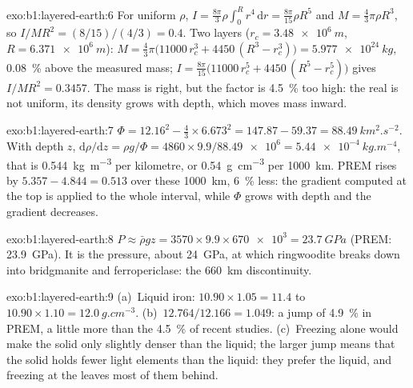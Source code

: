\begin{solution}{exo:b1:layered-earth:6}
For uniform $\rho$, $I = \tfrac{8\pi}{3}\rho\int_0^R r^4\,\mathrm dr =
\tfrac{8\pi}{15}\rho R^5$ and $M = \tfrac43\pi\rho R^3$, so
$I/MR^2 = (8/15)/(4/3) = 0.4$. Two layers ($r_c = \qty{3.48e6}{m}$,
$R = \qty{6.371e6}{m}$): $M = \tfrac43\pi\bigl(11000\,r_c^3 + 4450\,(R^3 -
r_c^3)\bigr) = \qty{5.977e24}{kg}$, \qty{0.08}{\percent} above the measured
mass; $I = \tfrac{8\pi}{15}\bigl(11000\,r_c^5 + 4450\,(R^5 - r_c^5)\bigr)$ gives
$I/MR^2 = 0.3457$. The mass is right, but the factor is \qty{4.5}{\percent}
too high: the real  is not uniform, its density grows with depth, which
moves mass inward.
\end{solution}

\begin{solution}{exo:b1:layered-earth:7}
$\Phi = 12.16^2 - \tfrac43\times6.673^2 = 147.87 - 59.37 =
\qty{88.49}{km^2.s^{-2}}$. With depth $z$,
$\mathrm d\rho/\mathrm dz = \rho g/\Phi = 4860\times9.9/\num{88.49e6} =
\qty{5.44e-4}{kg.m^{-4}}$, that is \qty{0.544}{kg.m^{-3}} per kilometre, or
\qty{0.54}{g.cm^{-3}} per \qty{1000}{km}. PREM rises by $5.357 - 4.844 =
0.513$ over these \qty{1000}{km}, \qty{6}{\percent} less: the gradient
computed at the top is applied to the whole interval, while $\Phi$ grows with
depth and the gradient decreases.
\end{solution}

\begin{solution}{exo:b1:layered-earth:8}
$P \approx \bar\rho g z = 3570\times9.9\times\num{670e3} = \qty{23.7}{GPa}$
(PREM: \qty{23.9}{GPa}). It is the pressure, about \qty{24}{GPa}, at which
ringwoodite breaks down into bridgmanite and ferropericlase: the
\qty{660}{km} discontinuity.
\end{solution}

\begin{solution}{exo:b1:layered-earth:9}
(a)~Liquid iron: $10.90\times1.05 = 11.4$ to $10.90\times1.10 =
\qty{12.0}{g.cm^{-3}}$. (b)~$12.764/12.166 = 1.049$: a jump of
\qty{4.9}{\percent} in PREM, a little more than the \qty{4.5}{\percent} of
recent studies. (c)~Freezing alone would make the solid only slightly denser
than the liquid; the larger jump means that the solid holds fewer light
elements than the liquid: they prefer the liquid, and freezing at the
 leaves most of them behind.
\end{solution}

